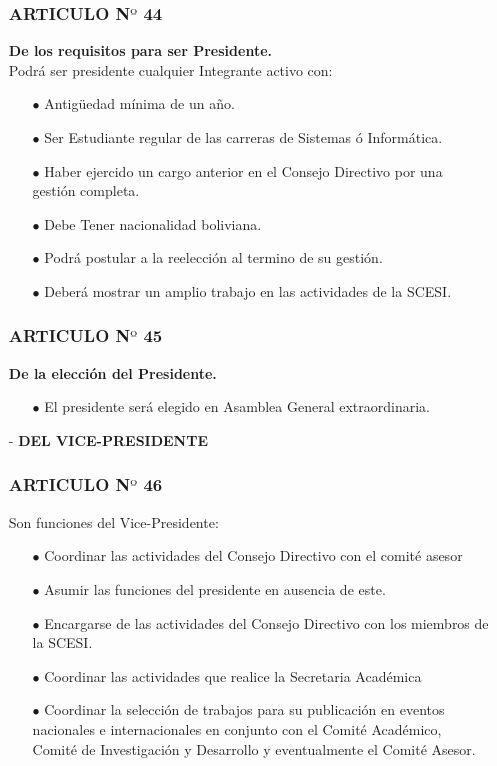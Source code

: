 \documentclass[11pt,letterpaper]{book}
\begin{document}
\begin{itemize}
\subsubsection*{ARTICULO N$º$ 44}
{\bf De los requisitos para ser Presidente.}\\
Podrá ser presidente cualquier Integrante activo con: 
\begin{itemize}
\item[$\bullet$] Antigüedad mínima de un año. 
\item[$\bullet$] Ser Estudiante regular de las carreras de Sistemas ó Informática. 
\item[$\bullet$] Haber ejercido un cargo anterior en el Consejo Directivo por una gestión completa. 
\item[$\bullet$] Debe Tener nacionalidad boliviana.  
\item[$\bullet$] Podrá postular a la reelección al termino de su gestión. 
\item[$\bullet$] Deberá mostrar un amplio trabajo en las actividades de la SCESI.
\end{itemize}
\subsubsection*{ARTICULO N$º$ 45}
{\bf De la elección del Presidente.}
\begin{itemize}
\item[$\bullet$] El presidente será elegido en Asamblea General extraordinaria.
\end{itemize}

\item[-] {\bf DEL VICE-PRESIDENTE}
\subsubsection*{ARTICULO N$º$ 46}
Son funciones del Vice-Presidente:
\begin{itemize}
\item[$\bullet$] Coordinar las actividades del Consejo Directivo con el comité asesor 
\item[$\bullet$] Asumir las funciones del presidente en ausencia de este.  
\item[$\bullet$] Encargarse de las actividades del Consejo Directivo con los miembros de la SCESI. 
\item[$\bullet$] Coordinar las actividades que realice la Secretaria Académica 
\item[$\bullet$] Coordinar la selección de trabajos para su publicación en eventos nacionales e internacionales en conjunto con el Comité Académico, Comité de Investigación y Desarrollo y eventualmente el Comité Asesor. 
\end{itemize}

\end{itemize}
\end{document}
